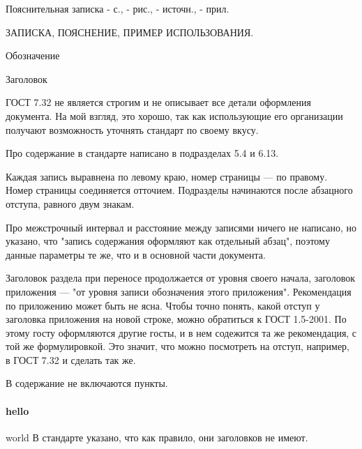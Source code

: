 






Пояснительная записка - с., - рис., - источн., - прил.

ЗАПИСКА, ПОЯСНЕНИЕ, ПРИМЕР ИСПОЛЬЗОВАНИЯ.




Обозначение

Заголовок


ГОСТ 7.32 не является строгим и не описывает все детали оформления документа.
На мой взгляд, это хорошо, так как использующие его организации получают
возможность уточнять стандарт по своему вкусу.



Про содержание в стандарте написано в подразделах 5.4 и 6.13.

Каждая запись выравнена по левому краю, номер страницы --- по правому. Номер
страницы соединяется отточием. Подразделы начинаются после абзацного отступа,
равного двум знакам.

Про межстрочный интервал и расстояние между записями ничего не написано, но
указано, что "запись содержания оформляют как отдельный абзац", поэтому данные
параметры те же, что и в основной части документа.

Заголовок раздела при переносе продолжается от уровня своего начала, заголовок
приложения --- "от уровня записи обозначения этого приложения". Рекомендация
по приложению может быть не ясна. Чтобы точно понять, какой отступ у заголовка
приложения на новой строке, можно обратиться к ГОСТ 1.5-2001. По этому госту
оформляются другие госты, и в нем содежится та же рекомендация, с той же
формулировкой. Это значит, что можно посмотреть на отступ, например, в ГОСТ
7.32 и сделать так же.

\foo{} В содержание не включаются пункты.
\paragraph{hello} 

world
\subparag В стандарте указано, что как правило, они заголовков не имеют.



